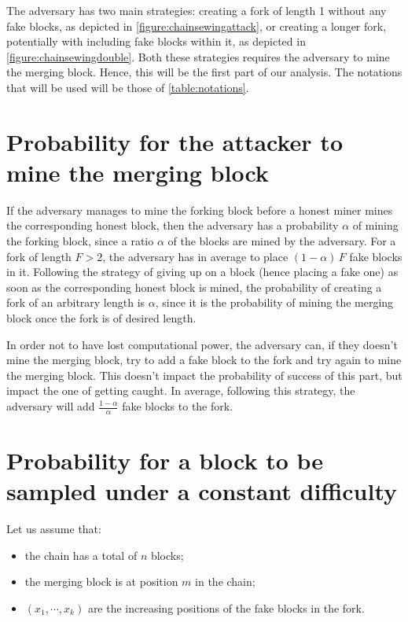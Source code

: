       The adversary has two main strategies: creating a fork of length 1 without any fake blocks, as depicted in \autoref{figure:chainsewingattack}, or creating a longer fork, potentially with including fake blocks within it, as depicted in \autoref{figure:chainsewingdouble}. Both these strategies requires the adversary to mine the merging block. Hence, this will be the first part of our analysis. The notations that will be used will be those of \autoref{table:notations}.
      
      \section{Probability for the attacker to mine the merging block}
        If the adversary manages to mine the forking block before a honest miner mines the corresponding honest block, then the adversary has a probability \(\alpha\) of mining the forking block, since a ratio \(\alpha\) of the blocks are mined by the adversary. For a fork of length \(F>2\), the adversary has in average to place \((1-\alpha)\,F\) fake blocks in it. Following the strategy of giving up on a block (hence placing a fake one) as soon as the corresponding honest block is mined, the probability of creating a fork of an arbitrary length is \(\alpha\), since it is the probability of mining the merging block once the fork is of desired length.
        
        In order not to have lost computational power, the adversary can, if they doesn't mine the merging block, try to add a fake block to the fork and try again to mine the merging block. This doesn't impact the probability of success of this part, but impact the one of getting caught. In average, following this strategy, the adversary will add \(\frac{1-\alpha}{\alpha}\) fake blocks to the fork.

      \section{Probability for a block to be sampled under a constant difficulty}
        Let us assume that:
        \begin{itemize}
          \item the chain has a total of \(n\) blocks;
          \item the merging block is at position \(m\) in the chain;
          \item \((x_1,\cdots,x_k)\) are the increasing positions of the fake blocks in the fork.
        \end{itemize}
        
